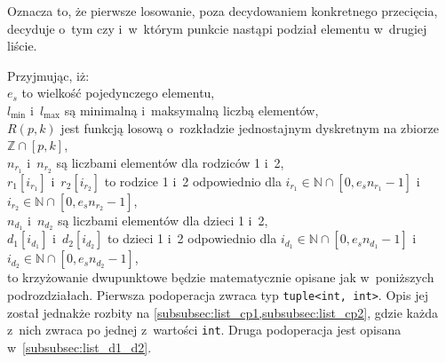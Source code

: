Oznacza to, że pierwsze losowanie,
poza decydowaniem konkretnego przecięcia,
decyduje o~tym czy i~w~którym punkcie
nastąpi podział elementu w~drugiej liście.

Przyjmując, iż:\\
$e_s$ to wielkość pojedynczego elementu,\\
$l_{\min}$ i~$l_{\max}$ są minimalną
  i~maksymalną liczbą  elementów,\\
$R\left(p, k\right)$ jest funkcją losową
  o~rozkładzie jednostajnym dyskretnym na zbiorze
  $\mathbb{Z} \cap \left[p, k\right]$,\\
$n_{r_1}$ i~$n_{r_2}$ są liczbami
  elementów dla rodziców 1 i~2,\\
$r_1\left[i_{r_1}\right]$ i~$r_2\left[i_{r_2}\right]$ to
  rodzice 1 i~2 odpowiednio dla $
    i_{r_1} \in \mathbb{N}
    \cap \left[0, e_s n_{r_1}-1\right]
  $ i~$
    i_{r_2} \in \mathbb{N}
    \cap \left[0, e_s n_{r_2}-1\right]
  $,\\
$n_{d_1}$ i~$n_{d_2}$ są liczbami
  elementów dla dzieci 1 i~2,\\
$d_1\left[i_{d_1}\right]$ i~$d_2\left[i_{d_2}\right]$ to
  dzieci 1 i~2 odpowiednio dla $
    i_{d_1} \in \mathbb{N}
    \cap \left[0, e_s n_{d_1}-1\right]
  $ i~$
    i_{d_2} \in \mathbb{N}
    \cap \left[0, e_s n_{d_2}-1\right]
  $,\\
to krzyżowanie dwupunktowe będzie matematycznie
opisane jak w~poniższych podrozdziałach.
Pierwsza podoperacja zwraca typ
\texttt{tuple{\textless}int, int{\textgreater}}.
Opis jej został jednakże rozbity na
\cref{subsubsec:list_cp1,subsubsec:list_cp2},
gdzie każda z~nich zwraca po jednej
z~wartości \texttt{int}.
Druga podoperacja jest opisana
w~\cref{subsubsec:list_d1_d2}.

